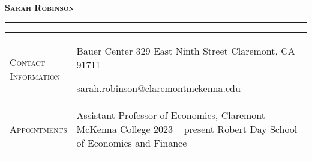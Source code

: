 \documentclass[11pt]{article}
\newcommand{\xspace}{19pt}
\begin{document}
\thispagestyle{firstpage}

\begin{center}
	\vspace*{-15pt}
	{\huge\textsc{\textbf{Sarah Robinson}}} \\[2pt]
\end{center}

\vspace{-6pt}

\noindent\rule{\textwidth}{1pt}

\vspace{3pt}

\begin{tabularx}{\textwidth}{@{}Y Z@{}}
	
	\textsc{Contact \newline Information} & 
	\begin{minipage}[t]{0.28\textwidth}
		Bauer Center 329  East Ninth Street \newline
		Claremont, CA 91711
	\end{minipage}\begin{minipage}[t]{0.45\textwidth}
	 sarah.robinson@claremontmckenna.edu \newline
	 \href{https://www.s-robinson.com}{\color{blue}{www.s-robinson.com}} 
	\end{minipage}
	\\ \addlinespace[\xspace] 
	
	\textsc{Appointments} &
	Assistant Professor of Economics, Claremont McKenna College \hfill  2023 -- present%
	\vspace{3pt} \newline
	\hspace*{20pt} Robert Day School of Economics and Finance
	\\  \addlinespace[\xspace] 
	

\end{tabularx}
\end{document}
